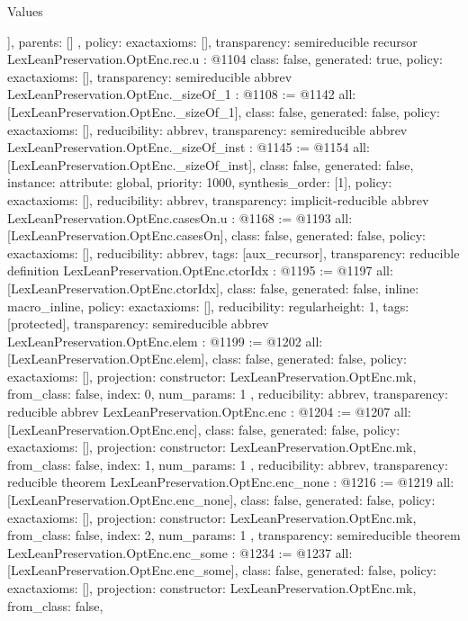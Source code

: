 \begin{lexlean}{Values}
\begin{coremodule}
{{{      ],
      parents: []
    }
  },
  policy: exact{axioms: []},
  transparency: semireducible
}
recursor LexLeanPreservation.OptEnc.rec.{u} : @1104 {
  class: false,
  generated: true,
  policy: exact{axioms: []},
  transparency: semireducible
}
abbrev LexLeanPreservation.OptEnc._sizeOf_1 : @1108 := @1142 {
  all: [LexLeanPreservation.OptEnc._sizeOf_1],
  class: false,
  generated: false,
  policy: exact{axioms: []},
  reducibility: abbrev{},
  transparency: semireducible
}
abbrev LexLeanPreservation.OptEnc._sizeOf_inst : @1145 := @1154 {
  all: [LexLeanPreservation.OptEnc._sizeOf_inst],
  class: false,
  generated: false,
  instance: {attribute: global, priority: 1000, synthesis_order: [1]},
  policy: exact{axioms: []},
  reducibility: abbrev{},
  transparency: implicit-reducible
}
abbrev LexLeanPreservation.OptEnc.casesOn.{u} : @1168 := @1193 {
  all: [LexLeanPreservation.OptEnc.casesOn],
  class: false,
  generated: false,
  policy: exact{axioms: []},
  reducibility: abbrev{},
  tags: [aux_recursor],
  transparency: reducible
}
definition LexLeanPreservation.OptEnc.ctorIdx : @1195 := @1197 {
  all: [LexLeanPreservation.OptEnc.ctorIdx],
  class: false,
  generated: false,
  inline: macro_inline,
  policy: exact{axioms: []},
  reducibility: regular{height: 1},
  tags: [protected],
  transparency: semireducible
}
abbrev LexLeanPreservation.OptEnc.elem : @1199 := @1202 {
  all: [LexLeanPreservation.OptEnc.elem],
  class: false,
  generated: false,
  policy: exact{axioms: []},
  projection: {
    constructor: LexLeanPreservation.OptEnc.mk,
    from_class: false,
    index: 0,
    num_params: 1
  },
  reducibility: abbrev{},
  transparency: reducible
}
abbrev LexLeanPreservation.OptEnc.enc : @1204 := @1207 {
  all: [LexLeanPreservation.OptEnc.enc],
  class: false,
  generated: false,
  policy: exact{axioms: []},
  projection: {
    constructor: LexLeanPreservation.OptEnc.mk,
    from_class: false,
    index: 1,
    num_params: 1
  },
  reducibility: abbrev{},
  transparency: reducible
}
theorem LexLeanPreservation.OptEnc.enc_none : @1216 := @1219 {
  all: [LexLeanPreservation.OptEnc.enc_none],
  class: false,
  generated: false,
  policy: exact{axioms: []},
  projection: {
    constructor: LexLeanPreservation.OptEnc.mk,
    from_class: false,
    index: 2,
    num_params: 1
  },
  transparency: semireducible
}
theorem LexLeanPreservation.OptEnc.enc_some : @1234 := @1237 {
  all: [LexLeanPreservation.OptEnc.enc_some],
  class: false,
  generated: false,
  policy: exact{axioms: []},
  projection: {
    constructor: LexLeanPreservation.OptEnc.mk,
    from_class: false,
}}
\end{coremodule}
\end{lexlean}

